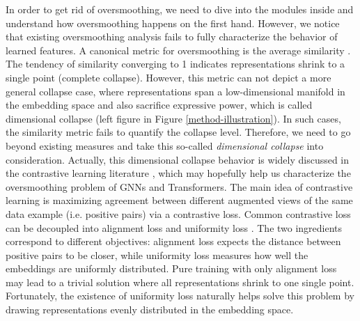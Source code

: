 \documentclass{article}
\theoremstyle{definition}
\theoremstyle{remark}
\theoremstyle{theorem}
\begin{document}
In order to get rid of oversmoothing, we need to dive into the modules inside and understand how oversmoothing happens on the first hand. However, we notice that existing oversmoothing analysis fails to fully characterize the behavior of learned features. A canonical metric for oversmoothing is the average similarity \citep{zhou2021deepvit, gong2021vision, wang2022anti}. The tendency of similarity converging to 1 indicates representations shrink to a single point (complete collapse). However, this metric can not depict a more general collapse case, where representations span a low-dimensional manifold in the embedding space and also sacrifice expressive power, which is called dimensional collapse (left figure in Figure \ref{method-illustration}). In such cases, the similarity metric fails to quantify the collapse level. Therefore, we need to go beyond existing measures and take this so-called \textit{dimensional collapse} into consideration. Actually, this dimensional collapse behavior is widely discussed in the contrastive learning literature \citep{jing2021understanding, hua2021feature, chen2021exploring, grill2020bootstrap}, which may hopefully help us characterize the oversmoothing problem of GNNs and Transformers. The main idea of contrastive learning is maximizing agreement between different augmented views of the same data example (i.e. positive pairs) via a contrastive loss. Common contrastive loss can be decoupled into alignment loss and uniformity loss \citep{wang2020understanding}. The two ingredients correspond to different objectives: alignment loss expects the distance between positive pairs to be closer, while uniformity loss measures how well the embeddings are uniformly distributed. 
Pure training with only alignment loss may lead to a trivial solution where all representations shrink to one single point. Fortunately, the existence of uniformity loss naturally helps solve this problem by drawing representations evenly distributed in the embedding space.
\end{document}
